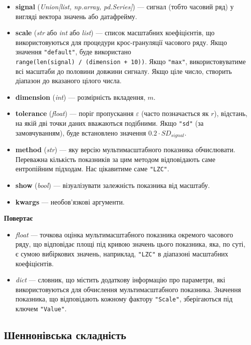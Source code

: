 \documentclass[
  letterpaper,
]{report}
\providecommand{\tightlist}{%
  \setlength{\itemsep}{0pt}\setlength{\parskip}{0pt}}\usepackage{longtable,booktabs,array}
\begin{document}
\begin{itemize}
\tightlist
\item
  \textbf{signal} (\emph{Union{[}list, np.array, pd.Series{]}}) ---
  сигнал (тобто часовий ряд) у вигляді вектора значень або датафрейму.
\item
  \textbf{scale} (\emph{str} або \emph{int} або \emph{list}) --- список
  масштабних коефіцієнтів, що використовуються для процедури
  крос-грануляції часового ряду. Якщо значення \texttt{"default"}, буде
  використано \texttt{range(len(signal)\ /\ (dimension\ +\ 10))}. Якщо
  \texttt{"max"}, використовуватиме всі масштаби до половини довжини
  сигналу. Якщо ціле число, створить діапазон до вказаного цілого числа.
\item
  \textbf{dimension} (\emph{int}) --- розмірність вкладення, \(m\).
\item
  \textbf{tolerance} (\emph{float}) --- поріг пропускання
  \(\varepsilon\) (часто позначається як \(r\)), відстань, на якій дві
  точки даних вважаються подібними. Якщо \texttt{"sd"} (за
  замовчуванням), буде встановлено значення \(0.2 \cdot SD_{signal}\).
\item
  \textbf{method} (\emph{str}) --- яку версію мультимасштабного
  показника обчислювати. Переважна кількість показників за цим методом
  відповідають саме ентропійним підходам. Нас цікавитиме саме
  \texttt{"LZC"}.
\item
  \textbf{show} (\emph{bool}) --- візуалізувати залежність показника від
  масштабу.
\item
  \textbf{kwargs} --- необов'язкові аргументи.
\end{itemize}

\textbf{Повертає}

\begin{itemize}
\tightlist
\item
  \emph{float} --- точкова оцінка мультимасштабного показника окремого
  часового ряду, що відповідає площі під кривою значень цього показника,
  яка, по суті, є сумою вибіркових значень, наприклад, \texttt{"LZC"} в
  діапазоні масштабних коефіцієнтів.
\item
  \emph{dict} --- словник, що містить додаткову інформацію про
  параметри, які використовуються для обчислення мультимасштабного
  показника. Значення показника, що відповідають кожному фактору
  \texttt{"Scale"}, зберігаються під ключем \texttt{"Value"}.
\end{itemize}

\hypertarget{ux448ux435ux43dux43dux43eux43dux456ux432ux441ux44cux43aux430-ux441ux43aux43bux430ux434ux43dux456ux441ux442ux44c}{%
\subsection{Шеннонівська
складність}\label{ux448ux435ux43dux43dux43eux43dux456ux432ux441ux44cux43aux430-ux441ux43aux43bux430ux434ux43dux456ux441ux442ux44c}}
\end{document}
